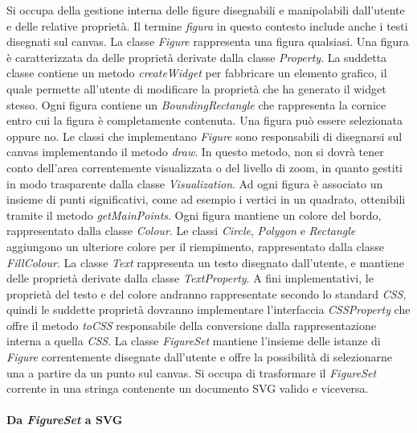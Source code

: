 Si occupa della gestione interna delle figure disegnabili e manipolabili dall'utente e delle relative propriet\`a. Il termine \textit{figura} in questo contesto include anche i testi disegnati sul canvas. La classe \textit{Figure} rappresenta una figura qualsiasi. Una figura \`e caratterizzata da delle propriet\`a derivate dalla classe \textit{Property}. La suddetta classe contiene un metodo \textit{createWidget} per fabbricare un elemento grafico, il quale permette all'utente di modificare la propriet\`a che ha generato il widget stesso. Ogni figura contiene un \textit{BoundingRectangle} che rappresenta la cornice entro cui la figura \`e completamente contenuta. Una figura pu\`o essere selezionata oppure no. Le classi che implementano \textit{Figure} sono responsabili di disegnarsi sul canvas implementando il metodo \textit{draw}. In questo metodo, non si dovr\`a tener conto dell'area correntemente visualizzata o del livello di zoom, in quanto gestiti in modo trasparente dalla classe \textit{Visualization}. Ad ogni figura \`e associato un insieme di punti significativi, come ad esempio i vertici in un quadrato, ottenibili tramite il metodo \textit{getMainPoints}. Ogni figura mantiene un colore del bordo, rappresentato dalla classe \textit{Colour}. Le classi \textit{Circle}, \textit{Polygon} e \textit{Rectangle} aggiungono un ulteriore colore per il riempimento, rappresentato dalla classe \textit{FillColour}. La classe \textit{Text} rappresenta un testo disegnato dall'utente, e mantiene delle propriet\`a derivate dalla classe \textit{TextProperty}. A fini implementativi, le propriet\`a del testo e del colore andranno rappresentate secondo lo standard \textit{CSS}, quindi le suddette propriet\`a dovranno implementare l'interfaccia \textit{CSSProperty} che offre il metodo \textit{toCSS} responsabile della conversione dalla rappresentazione interna a quella \textit{CSS}. La classe \textit{FigureSet} mantiene l'insieme delle istanze di \textit{Figure} correntemente disegnate dall'utente e offre la possibilit\`a di selezionarne una a partire da un punto sul canvas.
\newpage
{}
Si occupa di trasformare il \textit{FigureSet} corrente in una stringa 
contenente un documento SVG valido e viceversa. 

\paragraph{Da \textit{FigureSet} a SVG}

